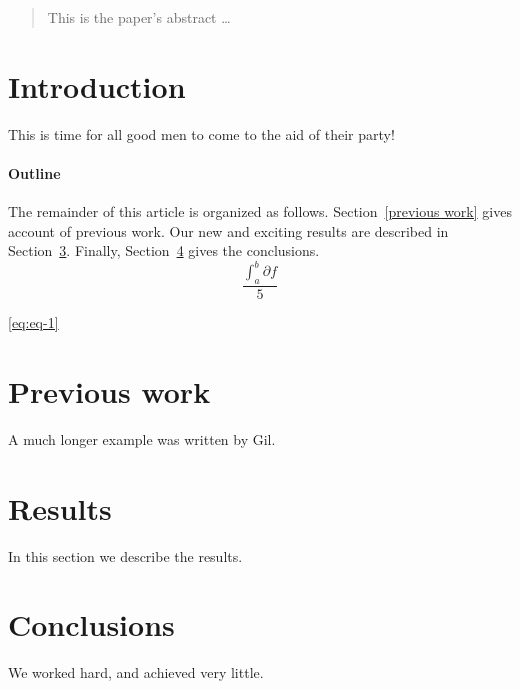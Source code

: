 \documentclass[12pt]{article}
\begin{document}
\maketitle

\begin{abstract}
        This is the paper's abstract \ldots
\end{abstract}

\section{Introduction}
This is time for all good men to come to the aid of their party!

\paragraph{Outline}
The remainder of this article is organized as follows.
Section~\ref{previous    work} gives account of previous work.
Our new and exciting results are described in Section~\ref{results}.
Finally, Section~\ref{conclusions} gives the conclusions.
\begin{equation}\label{eq:eq-1}
        \frac{\int_{a}^{b}\partial f}{5}
\end{equation}

\ref{eq:eq-1}
\section{Previous work}\label{previous work}
A much longer \LaTeXe{} example was written by Gil.

\section{Results}\label{results}
In this section we describe the results.

\section{Conclusions}\label{conclusions}
We worked hard, and achieved very little.
\end{document}

